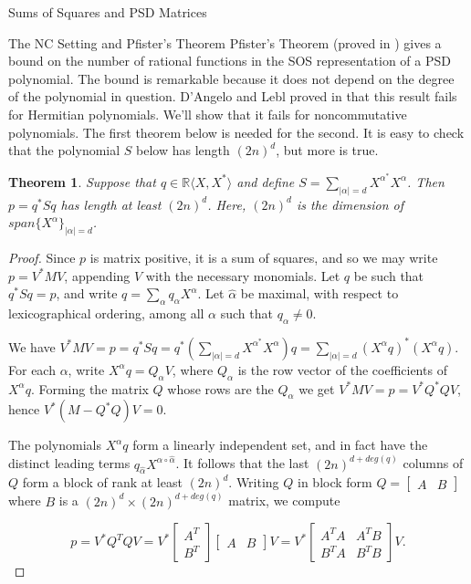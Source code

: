 \documentclass[12pt,oneside,final]{ucthesisucsbmath2010}
\newcommand{\R}{\mathbb{R}}
\newtheorem{thm}{Theorem}[section]
\theoremstyle{definition}
\begin{document}
\begin{chapter}{Sums of Squares and PSD Matrices}
\begin{section}{The NC Setting and Pfister's Theorem}
Pfister's Theorem (proved in \cite{PFIST}) gives a bound on the number of rational functions in the SOS representation of a PSD polynomial. The bound is remarkable because it does not depend on the degree of the polynomial in question. D'Angelo and Lebl proved in \cite{DAN} that this result fails for Hermitian polynomials.  We'll show that it fails for noncommutative polynomials. The first theorem below is needed for the second. It is easy to check that the polynomial $S$ below has length $(2n)^d$, but more is true. 
\begin{thm}
Suppose that $q \in \R\langle X, X^*\rangle$ and define $S=\sum_{|\alpha|=d} X^{\alpha^*}X^\alpha$. Then $p=q^*Sq$ has length at least $(2n)^d$.  Here, $(2n)^d$ is the dimension of $span\{X^\alpha\}_{|\alpha|=d}$.
\label{threepointone}
\end{thm}

\begin{proof} Since $p$ is matrix positive, it is a sum of squares, and so we may write $p = V^*MV$, appending $V$ with the necessary monomials.  Let $q$ be such that $q^*Sq=p$, and write $q= \sum_\alpha q_\alpha X^\alpha$.  Let $\hat \alpha$ be maximal, with respect to lexicographical ordering, among all $\alpha$ such that $q_\alpha \neq 0$.

We have $V^*MV=p=q^*Sq=q^*( \sum_{|\alpha|=d} X^{\alpha^*}X^\alpha)q=\sum_{|\alpha|=d} (X^{\alpha}q)^*(X^\alpha q)$. For each $\alpha$, write $X^\alpha q= Q_\alpha V$, where $Q_\alpha$ is the row vector of the coefficients of $X^\alpha q$.  Forming the matrix $Q$ whose rows are the $Q_\alpha$ we get $V^*MV=p=V^*Q^*QV$, hence $V^*(M-Q^*Q)V=0$.  

The polynomials $X^\alpha q$ form a linearly independent set, and in fact have the distinct leading terms $q_{\hat \alpha}X^{\alpha \circ \hat \alpha}$.  It follows that the last $(2n)^{d+deg(q)}$ columns of $Q$ form a block of rank at least $(2n)^d$.  Writing $Q$ in block form $Q=\begin{bmatrix}A&B\end{bmatrix}$ where $B$ is a $(2n)^d\times (2n)^{d+deg(q)}$ matrix, we compute

\[p=V^*Q^TQV=V^*\begin{bmatrix} A^T \\ B^T \end{bmatrix} \begin{bmatrix}A&B\end{bmatrix}V=V^*\begin{bmatrix}A^TA & A^TB\\ B^TA & B^TB\end{bmatrix}V.\]



\end{proof}
\end{section}
\end{chapter}
\end{document}
